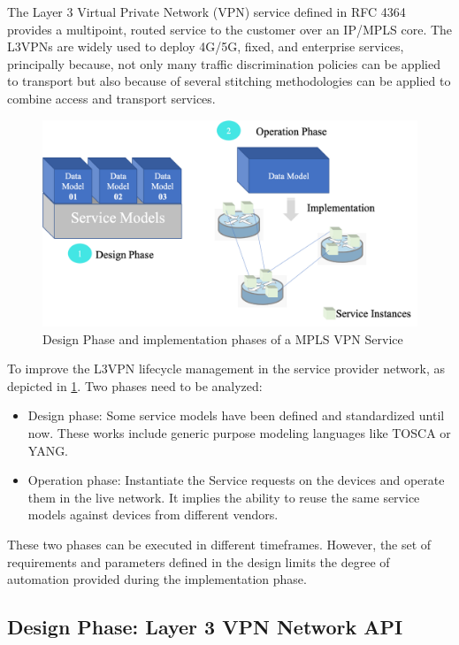 \documentclass[conference]{IEEEtran}
\begin{document}
The Layer 3 Virtual Private Network (VPN) service defined in RFC 4364 \cite{rosen2006rfc} provides a multipoint, routed service to the customer over an IP/MPLS core. The L3VPNs are widely used to deploy 4G/5G, fixed, and enterprise services, principally because, not only many traffic discrimination policies can be applied to transport but also because of several stitching methodologies can be applied to combine access and transport services. 

\begin{figure}
	\centering
		\includegraphics[scale=0.3]{figure2png.png}
	\caption{Design Phase and implementation phases of a MPLS VPN Service}
	\label{FIG:2}
\end{figure}

To improve the L3VPN lifecycle management in the service provider network, as depicted in \cref{FIG:2}. Two phases need to be analyzed:
\begin{itemize}
    \item Design phase: Some service models have been defined and standardized until now. These works include generic purpose modeling languages like TOSCA or YANG.
    \item Operation phase: Instantiate the Service requests on the devices and operate them in the live network. It implies the ability to reuse the same service models against devices from different vendors.
\end{itemize}

These two phases can be executed in different timeframes. However, the set of requirements and parameters defined in the design limits the degree of automation provided during the implementation phase. 

\subsection{Design Phase: Layer 3 VPN Network API}
\end{document}
